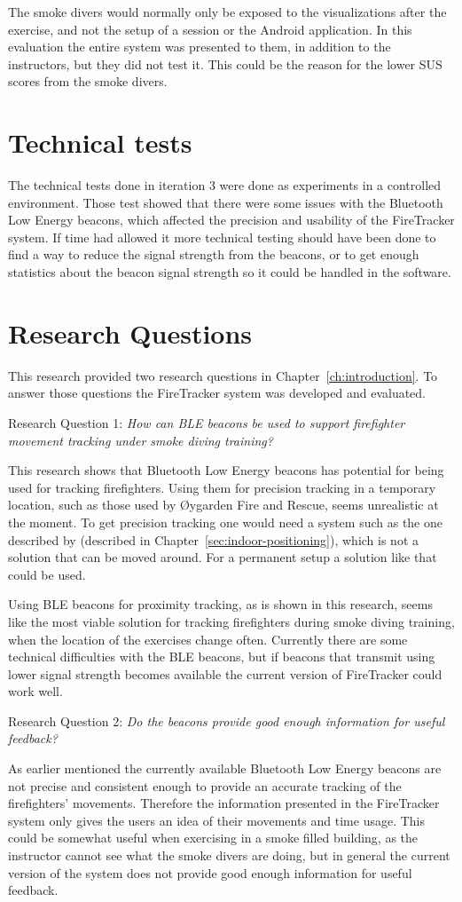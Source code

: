 \documentclass[../Main/thesis.tex]{subfiles}
\begin{document}
The smoke divers would normally only be exposed to the visualizations after the exercise, and not the setup of a session or the Android application.
In this evaluation the entire system was presented to them, in addition to the instructors, but they did not test it.
This could be the reason for the lower SUS scores from the smoke divers.

\section{Technical tests}
The technical tests done in iteration 3 were done as experiments in a controlled environment.
Those test showed that there were some issues with the Bluetooth Low Energy beacons, which affected the precision and usability of the FireTracker system.
If time had allowed it more technical testing should have been done to find a way to reduce the signal strength from the beacons, or to get enough statistics about the beacon signal strength so it could be handled in the software.

\section{Research Questions}
This research provided two research questions in Chapter~\ref{ch:introduction}.
To answer those questions the FireTracker system was developed and evaluated.

Research Question 1: \textit{How can BLE beacons be used to support firefighter movement tracking under smoke diving training?}

This research shows that Bluetooth Low Energy beacons has potential for being used for tracking firefighters.
Using them for precision tracking in a temporary location, such as those used by Øygarden Fire and Rescue, seems unrealistic at the moment.
To get precision tracking one would need a system such as the one described by \citep{Takahashi2016} (described in Chapter~\ref{sec:indoor-positioning}), which is not a solution that can be moved around.
For a permanent setup a solution like that could be used.

Using BLE beacons for proximity tracking, as is shown in this research, seems like the most viable solution for tracking firefighters during smoke diving training, when the location of the exercises change often.
Currently there are some technical difficulties with the BLE beacons, but if beacons that transmit using lower signal strength becomes available the current version of FireTracker could work well.

Research Question 2: \textit{Do the beacons provide good enough information for useful feedback?}

As earlier mentioned the currently available Bluetooth Low Energy beacons are not precise and consistent enough to provide an accurate tracking of the firefighters' movements.
Therefore the information presented in the FireTracker system only gives the users an idea of their movements and time usage.
This could be somewhat useful when exercising in a smoke filled building, as the instructor cannot see what the smoke divers are doing, but in general the current version of the system does not provide good enough information for useful feedback.
\end{document}
